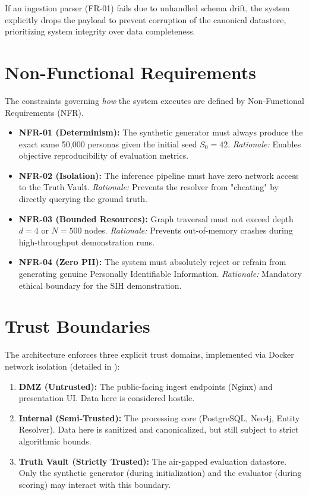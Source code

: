 If an ingestion parser (FR-01) fails due to unhandled schema drift, the system explicitly drops the payload to prevent corruption of the canonical datastore, prioritizing system integrity over data completeness.

\section{Non-Functional Requirements}
\label{sec:requirements-nonfunctional}
The constraints governing \textit{how} the system executes are defined by Non-Functional Requirements (NFR). 

\begin{itemize}
    \item \textbf{NFR-01 (Determinism):} The synthetic generator must always produce the exact same 50,000 personas given the initial seed $S_0=42$. \textit{Rationale:} Enables objective reproducibility of evaluation metrics.
    \item \textbf{NFR-02 (Isolation):} The inference pipeline must have zero network access to the Truth Vault. \textit{Rationale:} Prevents the resolver from "cheating" by directly querying the ground truth.
    \item \textbf{NFR-03 (Bounded Resources):} Graph traversal must not exceed depth $d=4$ or $N=500$ nodes. \textit{Rationale:} Prevents out-of-memory crashes during high-throughput demonstration runs.
    \item \textbf{NFR-04 (Zero PII):} The system must absolutely reject or refrain from generating genuine Personally Identifiable Information. \textit{Rationale:} Mandatory ethical boundary for the SIH demonstration.
\end{itemize}

\section{Trust Boundaries}
\label{sec:requirements-trust-boundaries}
The architecture enforces three explicit trust domains, implemented via Docker network isolation (detailed in ):

\begin{enumerate}
    \item \textbf{DMZ (Untrusted):} The public-facing ingest endpoints (Nginx) and presentation UI. Data here is considered hostile.
    \item \textbf{Internal (Semi-Trusted):} The processing core (PostgreSQL, Neo4j, Entity Resolver). Data here is sanitized and canonicalized, but still subject to strict algorithmic bounds.
    \item \textbf{Truth Vault (Strictly Trusted):} The air-gapped evaluation datastore. Only the synthetic generator (during initialization) and the evaluator (during scoring) may interact with this boundary.
\end{enumerate}

